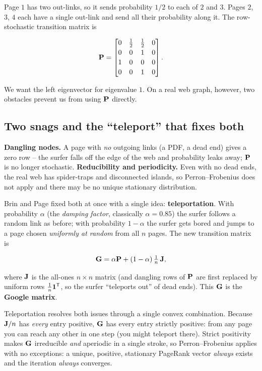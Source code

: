 Page $1$ has two out-links, so it sends probability $1/2$ to each of $2$ and $3$. Pages $2$,
$3$, $4$ each have a single out-link and send all their probability along it. The
row-stochastic transition matrix is

\[
\mathbf{P} =
\begin{bmatrix}
0 & \tfrac12 & \tfrac12 & 0\\[2pt]
0 & 0 & 1 & 0\\[2pt]
1 & 0 & 0 & 0\\[2pt]
0 & 0 & 1 & 0
\end{bmatrix}.
\]

We want the left eigenvector for eigenvalue $1$. On a real web graph, however, two
obstacles prevent us from using $\mathbf{P}$ directly.

\subsection{Two snags and the ``teleport'' that fixes both}

\textbf{Dangling nodes.} A page with \emph{no} outgoing links (a PDF, a dead end) gives a
zero row -- the surfer falls off the edge of the web and probability leaks away; $\mathbf{P}$
is no longer stochastic. \textbf{Reducibility and periodicity.} Even with no dead ends, the
real web has spider-traps and disconnected islands, so Perron--Frobenius does not apply and
there may be no unique stationary distribution.

Brin and Page fixed both at once with a single idea: \textbf{teleportation}. With
probability $\alpha$ (the \emph{damping factor}, classically $\alpha = 0.85$) the surfer
follows a random link as before; with probability $1-\alpha$ the surfer gets bored and jumps
to a page chosen \emph{uniformly at random} from all $n$ pages. The new transition matrix is

\[
\mathbf{G} = \alpha \mathbf{P} + (1-\alpha)\,\tfrac1n\,\mathbf{J},
\]

where $\mathbf{J}$ is the all-ones $n\times n$ matrix (and dangling rows of $\mathbf{P}$ are first
replaced by uniform rows $\tfrac1n\mathbf{1}^{\mathsf{T}}$, so the surfer ``teleports out'' of dead ends).
This $\mathbf{G}$ is the \textbf{Google matrix}.

\begin{aestheticbox}
Teleportation resolves both issues through a single convex combination. Because $\mathbf{J}/n$ has
\emph{every} entry positive, $\mathbf{G}$ has every entry strictly positive: from any page you
can reach any other in one step (you might teleport there). Strict positivity makes
$\mathbf{G}$ irreducible \emph{and} aperiodic in a single stroke, so Perron--Frobenius applies
with no exceptions: a unique, positive, stationary PageRank vector \emph{always} exists and
the iteration \emph{always} converges.
\end{aestheticbox}


